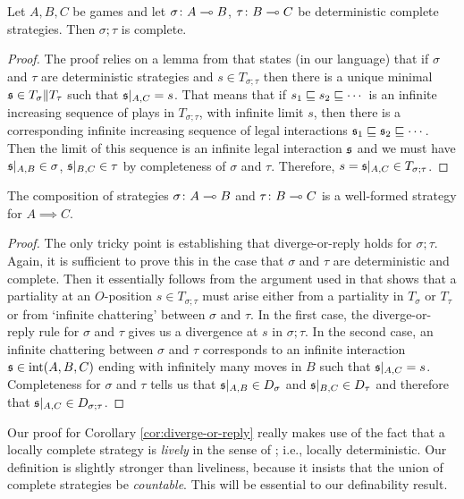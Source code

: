 \documentclass[sigplan,10pt,review]{acmart}\settopmatter{printfolios=true,printccs=false,printacmref=false}
\begin{document}
\begin{lemma}
  Let $A,B,C$ be games and let $\sigma\colon A\multimap B$, $\tau\colon B\multimap C$ be deterministic complete strategies.  
  Then $\sigma;\tau$ is complete.
  \label{lem:complete-deterministic-composition}
\end{lemma}
\begin{proof}
  The proof relies on a lemma from \cite{hoPcf} that states (in our language) that if $\sigma$ and $\tau$ are deterministic strategies and $s\in T_{\sigma;\tau}$ then there is a unique minimal $\mathfrak s\in T_\sigma\|T_\tau$ such that $\mathfrak s\vert_{A,C}=s$.  
  That means that if $s_1\sqsubseteq s_2\sqsubseteq \cdots$ is an infinite increasing sequence of plays in $T_{\sigma;\tau}$, with infinite limit $s$, then there is a corresponding infinite increasing sequence of legal interactions $\mathfrak s_1 \sqsubseteq \mathfrak s_2 \sqsubseteq \cdots$.  
  Then the limit of this sequence is an infinite legal interaction $\mathfrak s$ and we must have $\mathfrak s\vert_{A,B}\in\sigma$, $\mathfrak s\vert_{B,C}\in\tau$ by completeness of $\sigma$ and $\tau$.  
  Therefore, $s=\mathfrak s\vert_{A,C}\in T_{\sigma;\tau}$.
\end{proof}

\begin{corollary}
  The composition of strategies $\sigma\colon A\multimap B$ and $\tau\colon B \multimap C$ is a well-formed strategy for $A\implies C$.
  \label{cor:diverge-or-reply}
\end{corollary}
\begin{proof}
  The only tricky point is establishing that diverge-or-reply holds for $\sigma;\tau$.  
  Again, it is sufficient to prove this in the case that $\sigma$ and $\tau$ are deterministic and complete.
  Then it essentially follows from the argument used in \cite{abramskyjagadeesangames} that shows that a partiality at an $O$-position $s\in T_{\sigma;\tau}$ must arise either from a partiality in $T_\sigma$ or $T_\tau$ or from `infinite chattering' between $\sigma$ and $\tau$.  
  In the first case, the diverge-or-reply rule for $\sigma$ and $\tau$ gives us a divergence at $s$ in $\sigma;\tau$.  
  In the second case, an infinite chattering between $\sigma$ and $\tau$ corresponds to an infinite interaction $\mathfrak s\in\operatorname{int}(A,B,C)$ ending with infinitely many moves in $B$ such that $\mathfrak s\vert_{A,C}=s$. 
  Completeness for $\sigma$ and $\tau$ tells us that $\mathfrak s\vert_{A,B}\in D_\sigma$ and $\mathfrak s\vert_{B,C}\in D_\tau$ and therefore that $\mathfrak s\vert_{A,C}\in D_{\sigma;\tau}$.  
\end{proof}

Our proof for Corollary \ref{cor:diverge-or-reply} really makes use of the fact that a locally complete strategy is \emph{lively} in the sense of \cite{LevyGsInfinite}; i.e., locally deterministic.  
Our definition is slightly stronger than liveliness, because it insists that the union of complete strategies be \emph{countable}.  
This will be essential to our definability result.
\end{document}
